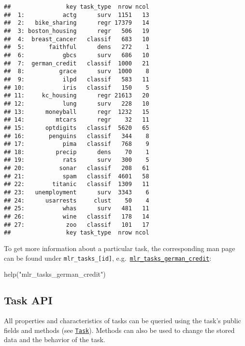 \documentclass[
]{scrbook}
\newenvironment{Shaded}{\begin{snugshade}}{\end{snugshade}}
\newcommand{\FunctionTok}[1]{\textcolor[rgb]{0.00,0.00,0.00}{#1}}
\newcommand{\NormalTok}[1]{#1}
\newcommand{\StringTok}[1]{\textcolor[rgb]{0.31,0.60,0.02}{#1}}
\renewenvironment{Shaded} {\begin{snugshade}\small} {\end{snugshade}}
\begin{document}
\begin{verbatim}
##                key task_type  nrow ncol
##  1:           actg      surv  1151   13
##  2:   bike_sharing      regr 17379   14
##  3: boston_housing      regr   506   19
##  4:  breast_cancer   classif   683   10
##  5:       faithful      dens   272    1
##  6:           gbcs      surv   686   10
##  7:  german_credit   classif  1000   21
##  8:          grace      surv  1000    8
##  9:           ilpd   classif   583   11
## 10:           iris   classif   150    5
## 11:     kc_housing      regr 21613   20
## 12:           lung      surv   228   10
## 13:      moneyball      regr  1232   15
## 14:         mtcars      regr    32   11
## 15:      optdigits   classif  5620   65
## 16:       penguins   classif   344    8
## 17:           pima   classif   768    9
## 18:         precip      dens    70    1
## 19:           rats      surv   300    5
## 20:          sonar   classif   208   61
## 21:           spam   classif  4601   58
## 22:        titanic   classif  1309   11
## 23:   unemployment      surv  3343    6
## 24:      usarrests     clust    50    4
## 25:           whas      surv   481   11
## 26:           wine   classif   178   14
## 27:            zoo   classif   101   17
##                key task_type  nrow ncol
\end{verbatim}

To get more information about a particular task, the corresponding man page can be found under \texttt{mlr\_tasks\_{[}id{]}}, e.g.~\href{https://mlr3.mlr-org.com/reference/mlr_tasks_german_credit.html}{\texttt{mlr\_tasks\_german\_credit}}:

\begin{Shaded}
\begin{Highlighting}[]
\FunctionTok{help}\NormalTok{(}\StringTok{"mlr\_tasks\_german\_credit"}\NormalTok{)}
\end{Highlighting}
\end{Shaded}

\hypertarget{tasks-api}{%
\subsection{Task API}\label{tasks-api}}

All properties and characteristics of tasks can be queried using the task's public fields and methods (see \href{https://mlr3.mlr-org.com/reference/Task.html}{\texttt{Task}}).
Methods can also be used to change the stored data and the behavior of the task.
\end{document}
